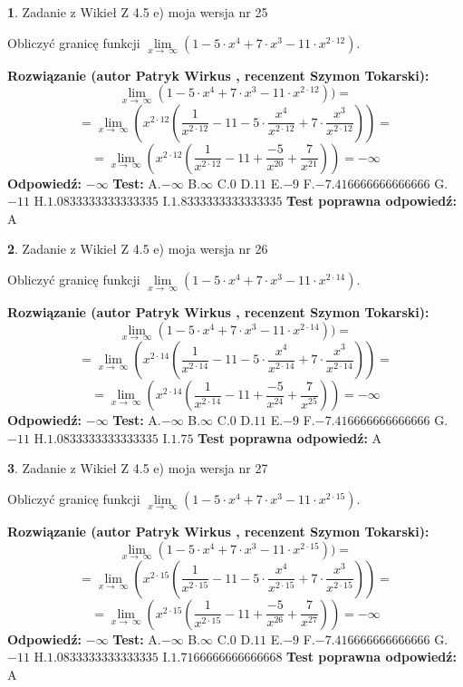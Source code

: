 \documentclass[12pt, a4paper]{article}
\theoremstyle{definition} %
\newtheorem{zad}{}
\newcommand{\zadStart}[1]{\begin{zad}#1\newline}
\newcommand{\zadStop}{\end{zad}}
\newcommand{\rozwStart}[2]{\noindent \textbf{Rozwiązanie (autor #1 , recenzent #2): }\newline}
\newcommand{\rozwStop}{\newline}
\newcommand{\odpStart}{\noindent \textbf{Odpowiedź:}\newline}
\newcommand{\odpStop}{\newline}
\newcommand{\testStart}{\noindent \textbf{Test:}\newline}
\newcommand{\testStop}{\newline}
\newcommand{\kluczStart}{\noindent \textbf{Test poprawna odpowiedź:}\newline}
\newcommand{\kluczStop}{\newline}
\begin{document}
\zadStart{Zadanie z Wikieł Z 4.5 e) moja wersja nr 25}


Obliczyć granicę funkcji  $\lim\limits_{x\to\ \infty}(1 - 5 \cdot x^{4}+7 \cdot x^{3}- 11 \cdot x^{2\cdot12})$.
\zadStop
\rozwStart{Patryk Wirkus}{Szymon Tokarski}
$$\lim\limits_{x\to\ \infty}(1 - 5 \cdot x^{4}+7 \cdot x^{3}- 11 \cdot x^{2\cdot12}))=$$
$$=\lim\limits_{x\to\ \infty}(x^{2\cdot12}(\frac{1}{x^{2\cdot12}}-11 -5 \cdot \frac{x^{4}}{x^{2\cdot12}}+7 \cdot \frac{x^{3}}{x^{2\cdot12}}))=$$
$$=\lim\limits_{x\to\ \infty}(x^{2\cdot12}(\frac{1}{x^{2\cdot12}}-11 + \frac{-5}{x^{20}}+ \frac{7}{x^{21}}))=-\infty$$
\rozwStop
\odpStart
$-\infty$
\odpStop
\testStart
A.$-\infty$ B.$\infty$ C.$0$ D.$11$ E.$-9$
F.$-7.416666666666666$ G.$-11$
H.$1.0833333333333335$
I.$1.8333333333333335$
\testStop
\kluczStart
A
\kluczStop



\zadStart{Zadanie z Wikieł Z 4.5 e) moja wersja nr 26}


Obliczyć granicę funkcji  $\lim\limits_{x\to\ \infty}(1 - 5 \cdot x^{4}+7 \cdot x^{3}- 11 \cdot x^{2\cdot14})$.
\zadStop
\rozwStart{Patryk Wirkus}{Szymon Tokarski}
$$\lim\limits_{x\to\ \infty}(1 - 5 \cdot x^{4}+7 \cdot x^{3}- 11 \cdot x^{2\cdot14}))=$$
$$=\lim\limits_{x\to\ \infty}(x^{2\cdot14}(\frac{1}{x^{2\cdot14}}-11 -5 \cdot \frac{x^{4}}{x^{2\cdot14}}+7 \cdot \frac{x^{3}}{x^{2\cdot14}}))=$$
$$=\lim\limits_{x\to\ \infty}(x^{2\cdot14}(\frac{1}{x^{2\cdot14}}-11 + \frac{-5}{x^{24}}+ \frac{7}{x^{25}}))=-\infty$$
\rozwStop
\odpStart
$-\infty$
\odpStop
\testStart
A.$-\infty$ B.$\infty$ C.$0$ D.$11$ E.$-9$
F.$-7.416666666666666$ G.$-11$
H.$1.0833333333333335$
I.$1.75$
\testStop
\kluczStart
A
\kluczStop



\zadStart{Zadanie z Wikieł Z 4.5 e) moja wersja nr 27}


Obliczyć granicę funkcji  $\lim\limits_{x\to\ \infty}(1 - 5 \cdot x^{4}+7 \cdot x^{3}- 11 \cdot x^{2\cdot15})$.
\zadStop
\rozwStart{Patryk Wirkus}{Szymon Tokarski}
$$\lim\limits_{x\to\ \infty}(1 - 5 \cdot x^{4}+7 \cdot x^{3}- 11 \cdot x^{2\cdot15}))=$$
$$=\lim\limits_{x\to\ \infty}(x^{2\cdot15}(\frac{1}{x^{2\cdot15}}-11 -5 \cdot \frac{x^{4}}{x^{2\cdot15}}+7 \cdot \frac{x^{3}}{x^{2\cdot15}}))=$$
$$=\lim\limits_{x\to\ \infty}(x^{2\cdot15}(\frac{1}{x^{2\cdot15}}-11 + \frac{-5}{x^{26}}+ \frac{7}{x^{27}}))=-\infty$$
\rozwStop
\odpStart
$-\infty$
\odpStop
\testStart
A.$-\infty$ B.$\infty$ C.$0$ D.$11$ E.$-9$
F.$-7.416666666666666$ G.$-11$
H.$1.0833333333333335$
I.$1.7166666666666668$
\testStop
\kluczStart
A
\kluczStop
\end{document}
